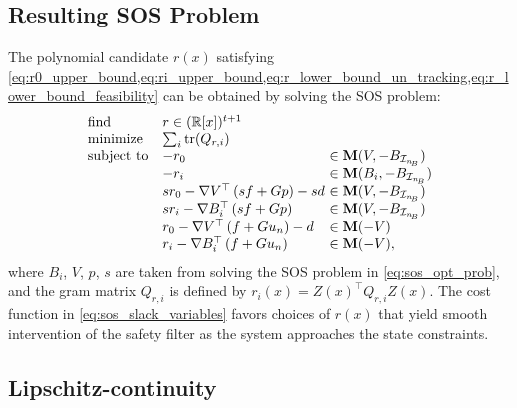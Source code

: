 \documentclass[lettersize,journal]{IEEEtran}
\newcommand{\R}{\mathbb{R}}
\newcommand{\afterReviewChangedBox}[1]{{\color{orange}#1}}
\begin{document}
\subsection{Resulting SOS Problem}

\afterReviewChangedBox{The polynomial candidate $r(x)$ satisfying \cref{eq:r0_upper_bound,eq:ri_upper_bound,eq:r_lower_bound_un_tracking,eq:r_lower_bound_feasibility} can be obtained by solving the SOS problem:
\begin{align}
   \label{eq:sos_slack_variables}
   \begin{array}{ll@{}l}
      \mbox{find} & r \in (\R[x])^{t+1} \\
      \mbox{minimize} & \sum_i \text{tr}(Q_{r,i}) \\
      \mbox{subject to} & -r_0 &\in \textbf M(V, -B_{\mathcal I_{n_{\!B}}}) \\
      & -r_i &\in \textbf M(B_i, -B_{\mathcal I_{n_{\!B}}}) \\
      & s r_0 -\nabla V^\top \left ( s f + G p \right ) - s d \,\, &\in \textbf M(V, -B_{\mathcal I_{n_{\!B}}}) \\
      & s r_i -\nabla B_i^\top \left ( s f + G p \right ) &\in \textbf M(V, -B_{\mathcal I_{n_{\!B}}}) \\
      & r_0 -\nabla V^\top \left ( f + G u_n \right ) - d &\in \textbf M(-V) \\
      & r_i -\nabla B_i^\top \left ( f + G u_n \right ) &\in \textbf M(-V), \\
   \end{array}
\end{align}
where $B_i$, $V$, $p$, $s$ are taken from solving the SOS problem in \cref{eq:sos_opt_prob}, and the gram matrix $Q_{r,i}$ is defined by $r_i(x) = Z(x)^\top Q_{r,i} Z(x)$.
The cost function in \cref{eq:sos_slack_variables} favors choices of $r(x)$ that yield smooth intervention of the safety filter as the system approaches the state constraints.}


\subsection{Lipschitz-continuity}
\end{document}
